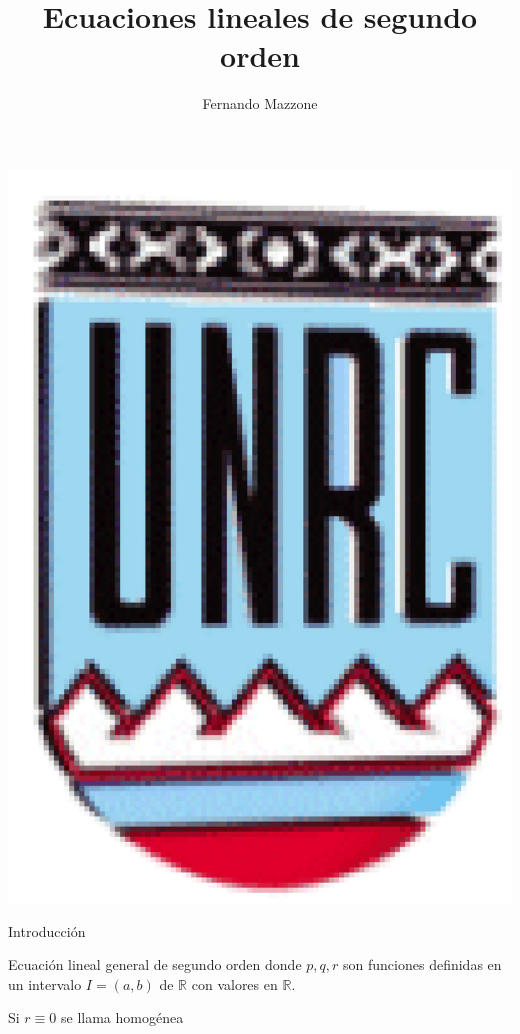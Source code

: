 \documentclass[handout,hyperref={colorlinks=true}]{beamer}
\title[Ecuaciones lineales de segundo orden] %
{%
 Ecuaciones lineales de segundo orden
}
\author[] %
{Fernando Mazzone}
\institute[Depto de Matemática] %
{
 Depto de Matemática\\
Facultad de Ciencias Exactas Físico-Químicas y Naturales\\
Universidad Nacional de Río Cuarto}
\newcommand{\rr}{\mathbb{R}}
\begin{document}
\begin{frame}
  \maketitle
  \begin{center}
   \includegraphics[scale=0.2]{imagenes/unrc.jpg}
   \end{center}
\end{frame}










\begin{frame}{Introducción}
\begin{block}{Ecuación lineal general de segundo orden}
donde $p,q,r$ son funciones definidas en un intervalo $I=(a,b)$ de $\rr$ con valores en $\rr$. 
\end{block}
Si $r\equiv 0$ se llama homogénea
\end{frame}
\end{document}
